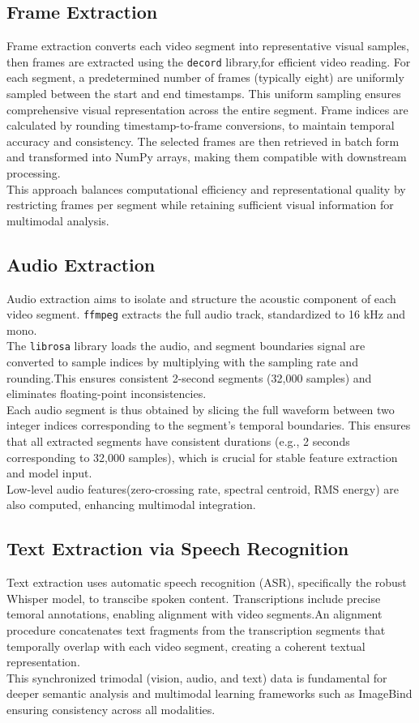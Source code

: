 \documentclass[12pt,a4paper,oneside,english]{book}
\begin{document}
\subsection{Frame Extraction}%
Frame extraction converts each video segment into representative visual samples, then frames are extracted using the \texttt{decord} library,for efficient video reading.
For each segment, a predetermined number of frames (typically eight) are uniformly sampled between the start and end timestamps. This uniform sampling ensures comprehensive visual representation across the entire segment.
Frame indices are calculated by rounding timestamp-to-frame conversions, to maintain temporal accuracy and consistency. The selected frames are then retrieved in batch form and transformed into NumPy arrays, making them compatible with downstream processing.
\\This approach balances computational efficiency and representational quality by restricting frames per segment while retaining sufficient visual information for multimodal analysis.

\subsection{Audio Extraction}%
Audio extraction aims to isolate and structure the acoustic component of each video segment. \texttt{ffmpeg} extracts the full audio track, standardized to 16 kHz and mono.
\\The \texttt{librosa} library loads the audio, and segment boundaries signal are converted to sample indices by multiplying with the sampling rate and rounding.This ensures consistent 2-second segments (32,000 samples) and eliminates floating-point inconsistencies.
\\Each audio segment is thus obtained by slicing the full waveform between two integer indices corresponding to the segment's temporal boundaries. This ensures that all extracted segments have consistent durations (e.g., 2 seconds corresponding to 32,000 samples), which is crucial for stable feature extraction and model input.
\\Low-level audio features(zero-crossing rate, spectral centroid, RMS energy) are also computed, enhancing multimodal integration.

\subsection{Text Extraction via Speech Recognition}%
Text extraction uses automatic speech recognition (ASR), specifically the robust Whisper model, to transcibe spoken content.
Transcriptions include precise temoral annotations, enabling alignment with video segments.An alignment procedure concatenates text fragments from the transcription segments that temporally overlap with each video segment, creating a coherent textual representation.
\\This synchronized trimodal (vision, audio, and text) data is fundamental for deeper semantic analysis and multimodal learning frameworks such as ImageBind  ensuring consistency across all modalities.
\end{document}
